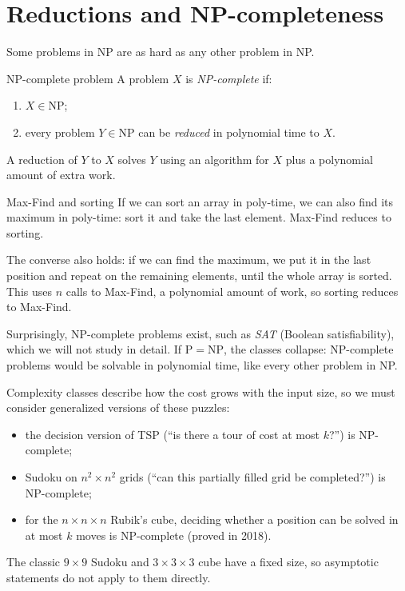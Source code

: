 \documentclass[a4paper,12pt,oneside]{report}
\begin{document}
\section{Reductions and NP-completeness}

Some problems in NP are as hard as any other problem in NP.

\begin{frameddefn}{NP-complete problem}\label{def:np-complete}
A problem $X$ is \emph{NP-complete} if:
\begin{enumerate}
  \item $X\in\mathrm{NP}$;
  \item every problem $Y\in\mathrm{NP}$ can be \emph{reduced} in
    polynomial time to $X$.
\end{enumerate}
\end{frameddefn}

A reduction of $Y$ to $X$ solves $Y$ using an algorithm for $X$ plus a
polynomial amount of extra work.

\begin{framedexample}{Max-Find and sorting}\label{ex:reduction-sort-max}
If we can sort an array in poly-time, we can also find its maximum in
poly-time: sort it and take the last element. Max-Find reduces to
sorting.

The converse also holds: if we can find the maximum, we put it in the
last position and repeat on the remaining elements, until the whole
array is sorted. This uses $n$ calls to Max-Find, a polynomial amount
of work, so sorting reduces to Max-Find.
\end{framedexample}

Surprisingly, NP-complete problems exist, such as \emph{SAT} (Boolean
satisfiability), which we will not study in detail. If
$\mathrm{P}=\mathrm{NP}$, the classes collapse: NP-complete problems
would be solvable in polynomial time, like every other problem in NP.

\begin{notebox}
Complexity classes describe how the cost grows with the input size, so
we must consider generalized versions of these puzzles:
\begin{itemize}
  \item the decision version of TSP (``is there a tour of cost at most
    $k$?'') is NP-complete;
  \item Sudoku on $n^2\times n^2$ grids (``can this partially filled
    grid be completed?'') is NP-complete;
  \item for the $n\times n\times n$ Rubik's cube, deciding whether a
    position can be solved in at most $k$ moves is NP-complete
    (proved in 2018).
\end{itemize}
The classic $9\times9$ Sudoku and $3\times3\times3$ cube have a fixed
size, so asymptotic statements do not apply to them directly.
\end{notebox}
\end{document}
